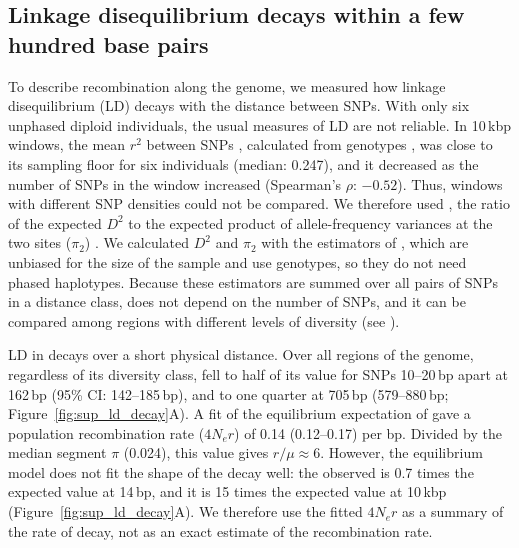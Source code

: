 \subsection*{Linkage disequilibrium decays within a few hundred base pairs}\label{sec:results_ld}

To describe recombination along the genome, we measured how linkage
disequilibrium (LD) decays with the distance between SNPs.
With only six unphased diploid individuals, the usual measures of LD are not reliable.
In 10\,kbp windows, the mean $r^{2}$ between SNPs \citep[$Z_{nS}$;][]{kelly_test_1997},
calculated from genotypes \citep{rogers_linkage_2009}, was close to its sampling floor
for six individuals (median: 0.247), and it decreased as the number of SNPs in the
window increased (Spearman's $\rho$: $-0.52$).
Thus, windows with different SNP densities could not be compared.
We therefore used \sdsq{}, the ratio of the expected $D^{2}$ to the expected
product of allele-frequency variances at the two sites ($\pi_{2}$)
\citep{ohta_linkage_1969}.
We calculated $D^{2}$ and $\pi_{2}$ with the estimators of
\citet{ragsdale_unbiased_2020}, which are unbiased for the size of the sample and
use genotypes, so they do not need phased haplotypes.
Because these estimators are summed over all pairs of SNPs in a distance class,
\sdsq{} does not depend on the number of SNPs, and it can be compared among
regions with different levels of diversity
(see ).
\vspace{0.1cm}

LD in \bgla{} decays over a short physical distance.
Over all regions of the genome, regardless of its diversity class, \sdsq{} fell
to half of its value for SNPs
10--20\,bp apart at 162\,bp (95\% CI: 142--185\,bp), and to one
quarter at 705\,bp (579--880\,bp; Figure~\ref{fig:sup_ld_decay}A).
A fit of the equilibrium expectation of \citet{ohta_linkage_1971} gave a population
recombination rate ($4N_{e}r$) of 0.14 (0.12--0.17) per bp.
Divided by the median segment $\pi$ (0.024), this value gives $r/\mu \approx 6$.
However, the equilibrium model does not fit the shape of the decay well: the observed
\sdsq{} is 0.7 times the expected value at 14\,bp, and it is 15 times the
expected value at 10\,kbp (Figure~\ref{fig:sup_ld_decay}A).
We therefore use the fitted $4N_{e}r$ as a summary of the rate of decay, not as an
exact estimate of the recombination rate.
\vspace{0.1cm}


